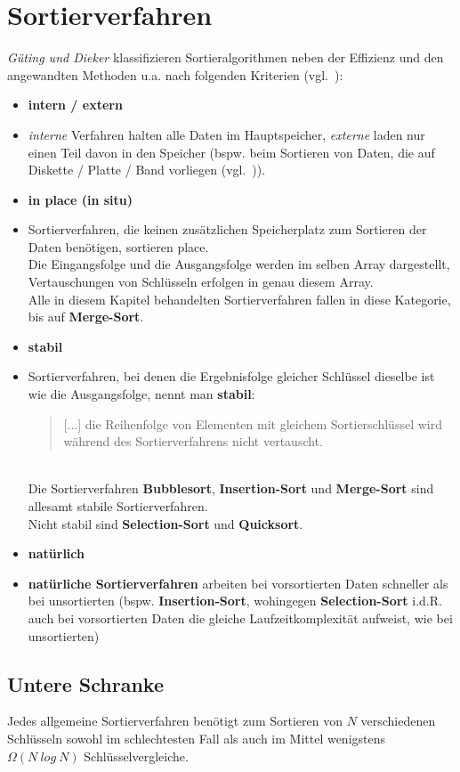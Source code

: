 \section{Sortierverfahren}

\textit{Güting und Dieker} klassifizieren Sortieralgorithmen neben der Effizienz und den angewandten Methoden u.a. nach folgenden Kriterien (vgl.~\cite[169 f.]{GD18e}):

\begin{itemize}
    \item \textbf{intern / extern}
    \item[] \textit{interne} Verfahren halten alle Daten im Hauptspeicher, \textit{externe} laden nur einen Teil davon in den Speicher (bspw. beim Sortieren von Daten, die auf Diskette / Platte / Band vorliegen (vgl.~\cite[80]{OW17b})).
    \item \textbf{in place (in situ)}
    \item [] Sortierverfahren, die keinen zusätzlichen Speicherplatz zum Sortieren der Daten benötigen, sortieren \textbfin place.\\
    Die Eingangsfolge und die Ausgangsfolge werden im selben Array dargestellt, Vertauschungen von Schlüsseln erfolgen in genau diesem Array.\\
    Alle in diesem Kapitel behandelten Sortierverfahren fallen in diese Kategorie, bis auf \textbf{Merge-Sort}.
    \item \textbf{stabil}
    \item[] Sortierverfahren, bei denen die Ergebnisfolge gleicher Schlüssel dieselbe ist wie die Ausgangsfolge, nennt man \textbf{stabil}:\blockquote[{\cite[164]{OW17b}}]{
        [...] die Reihenfolge von Elementen mit gleichem Sortierschlüssel wird während des Sortierverfahrens nicht vertauscht.
    }.\\
    Die Sortierverfahren \textbf{Bubblesort}, \textbf{Insertion-Sort} und \textbf{Merge-Sort} sind allesamt stabile Sortierverfahren.\\
    Nicht stabil sind \textbf{Selection-Sort} und \textbf{Quicksort}.
    \item \textbf{natürlich}
    \item[] \textbf{natürliche Sortierverfahren} arbeiten bei vorsortierten Daten schneller als bei unsortierten (bspw. \textbf{Insertion-Sort}, wohingegen \textbf{Selection-Sort} i.d.R. auch bei vorsortierten Daten die gleiche Laufzeitkomplexität aufweist, wie bei unsortierten)
\end{itemize}

\subsection{Untere Schranke}

\begin{tcolorbox}
    Jedes allgemeine Sortierverfahren benötigt zum Sortieren von $N$ verschiedenen Schlüsseln sowohl im schlechtesten Fall als auch im Mittel wenigstens $\Omega(N\ log\ N)$ Schlüsselvergleiche.
\end{tcolorbox}
